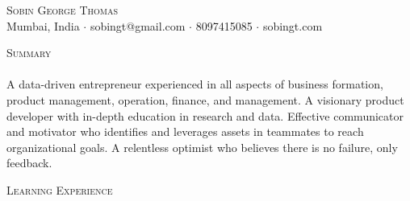 \documentclass[a4paper]{article}
\newcommand{\lineunder} {
    \vspace*{-8pt} \\
    \hspace*{-18pt} \hrulefill \\
}
\newcommand{\header} [1] {
    {\hspace*{-18pt}\vspace*{6pt} \textsc{#1}}
    \vspace*{-6pt} \lineunder
}
\begin{document}
\vspace*{-40pt}

    

\vspace*{-10pt}
\begin{center}
	{\Huge \scshape {Sobin George Thomas}}\\
	Mumbai, India $\cdot$ sobingt@gmail.com $\cdot$ 8097415085 $\cdot$ sobingt.com\\
\end{center}

\header{Summary}
A data-driven entrepreneur experienced in all aspects of business formation, product management, operation, finance, and management. A visionary product developer with in-depth education in research and data. Effective communicator and motivator who identifies and leverages assets in teammates to reach organizational goals. A relentless optimist who believes there is no failure, only feedback.\\
\vspace*{2mm}

\header{Learning Experience}
\vspace{1mm}
\end{document}
